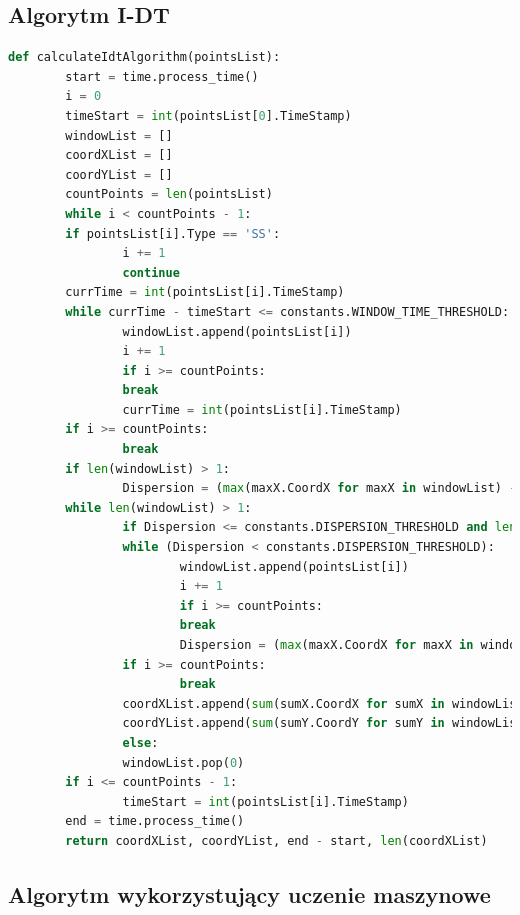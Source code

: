 \subsection{Algorytm I-DT}
\begin{lstlisting}[language=Python, caption=Kod algorytmu I-DT, label={lst:idt}]
def calculateIdtAlgorithm(pointsList):
        start = time.process_time()
        i = 0
        timeStart = int(pointsList[0].TimeStamp)
        windowList = []
        coordXList = []
        coordYList = []
        countPoints = len(pointsList)
        while i < countPoints - 1:
        if pointsList[i].Type == 'SS':
                i += 1
                continue
        currTime = int(pointsList[i].TimeStamp)
        while currTime - timeStart <= constants.WINDOW_TIME_THRESHOLD:
                windowList.append(pointsList[i])
                i += 1
                if i >= countPoints:
                break
                currTime = int(pointsList[i].TimeStamp)
        if i >= countPoints:
                break
        if len(windowList) > 1:
                Dispersion = (max(maxX.CoordX for maxX in windowList) - min(minX.CoordX for minX in windowList)) + (max(maxY.CoordY for maxY in windowList) - min(minY.CoordY for minY in windowList))
        while len(windowList) > 1:
                if Dispersion <= constants.DISPERSION_THRESHOLD and len(windowList) > 1:
                while (Dispersion < constants.DISPERSION_THRESHOLD):
                        windowList.append(pointsList[i])
                        i += 1
                        if i >= countPoints:
                        break
                        Dispersion = (max(maxX.CoordX for maxX in windowList) - min(minX.CoordX for minX in windowList)) + (max(maxY.CoordY for maxY in windowList) - min(minY.CoordY for minY in windowList))
                if i >= countPoints:
                        break
                coordXList.append(sum(sumX.CoordX for sumX in windowList) / len(windowList))
                coordYList.append(sum(sumY.CoordY for sumY in windowList) / len(windowList))
                else:
                windowList.pop(0)
        if i <= countPoints - 1:
                timeStart = int(pointsList[i].TimeStamp)
        end = time.process_time()
        return coordXList, coordYList, end - start, len(coordXList)
\end{lstlisting}
\subsection{Algorytm wykorzystujący uczenie maszynowe}
\label{ssec:machinelearningalg}
\blindtext
